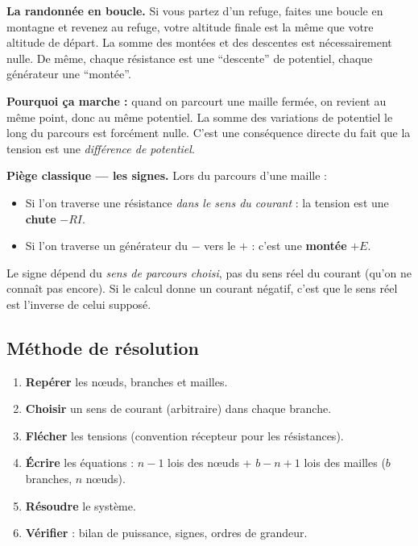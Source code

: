 \documentclass[12pt,a4paper,twoside]{book}
\begin{document}
\begin{analogie}
\textbf{La randonnée en boucle.} Si vous partez d'un refuge, faites une boucle en montagne et revenez au refuge, votre altitude finale est la même que votre altitude de départ. La somme des montées et des descentes est nécessairement nulle. De même, chaque résistance est une ``descente'' de potentiel, chaque générateur une ``montée''.
\end{analogie}

\begin{intuition}
\textbf{Pourquoi ça marche :} quand on parcourt une maille fermée, on revient au même point, donc au même potentiel. La somme des variations de potentiel le long du parcours est forcément nulle. C'est une conséquence directe du fait que la tension est une \textit{différence de potentiel}.
\end{intuition}

\begin{attention}
\textbf{Piège classique --- les signes.} Lors du parcours d'une maille :
\begin{itemize}[nosep]
\item Si l'on traverse une résistance \textit{dans le sens du courant} : la tension est une \textbf{chute} $-RI$.
\item Si l'on traverse un générateur du $-$ vers le $+$ : c'est une \textbf{montée} $+E$.
\end{itemize}
Le signe dépend du \textit{sens de parcours choisi}, pas du sens réel du courant (qu'on ne connaît pas encore). Si le calcul donne un courant négatif, c'est que le sens réel est l'inverse de celui supposé.
\end{attention}

\subsection{Méthode de résolution}

\begin{enumerate}
\item \textbf{Repérer} les n\oe uds, branches et mailles.
\item \textbf{Choisir} un sens de courant (arbitraire) dans chaque branche.
\item \textbf{Flécher} les tensions (convention récepteur pour les résistances).
\item \textbf{Écrire} les équations : $n-1$ lois des n\oe uds + $b - n + 1$ lois des mailles ($b$ branches, $n$ n\oe uds).
\item \textbf{Résoudre} le système.
\item \textbf{Vérifier} : bilan de puissance, signes, ordres de grandeur.
\end{enumerate}
\end{document}
